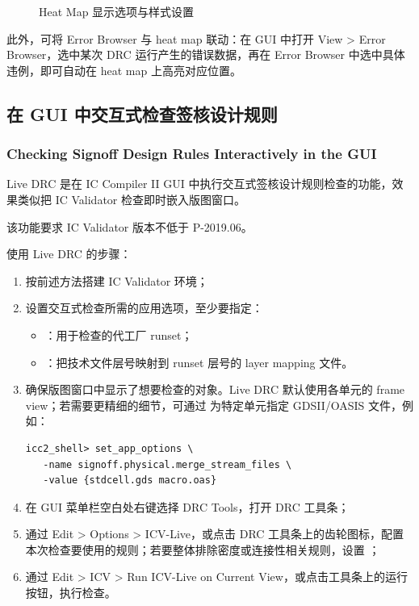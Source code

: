 \begin{figure}[htbp]
\centering
{}
\caption{Heat Map 显示选项与样式设置}
\label{fig:icv-heatmap-config}
\end{figure}

此外，可将 Error Browser 与 heat map 联动：在 GUI 中打开 View > Error Browser，选中某次 DRC 运行产生的错误数据，再在 Error Browser 中选中具体违例，即可自动在 heat map 上高亮对应位置。

\subsection{在 GUI 中交互式检查签核设计规则}
\subsubsection*{Checking Signoff Design Rules Interactively in the GUI}

Live DRC 是在 IC Compiler II GUI 中执行交互式签核设计规则检查的功能，效果类似把 IC Validator 检查即时嵌入版图窗口。

\begin{noteBox}
该功能要求 IC Validator 版本不低于 P-2019.06。
\end{noteBox}

使用 Live DRC 的步骤：
\begin{enumerate}
  \item 按前述方法搭建 IC Validator 环境；
  \item 设置交互式检查所需的应用选项，至少要指定：
        \begin{itemize}
          \item {}：用于检查的代工厂 runset；
          \item {}：把技术文件层号映射到 runset 层号的 layer mapping 文件。
        \end{itemize}
  \item 确保版图窗口中显示了想要检查的对象。Live DRC 默认使用各单元的 frame view；若需要更精细的细节，可通过  为特定单元指定 GDSII/OASIS 文件，例如：
\begin{lstlisting}
icc2_shell> set_app_options \
   -name signoff.physical.merge_stream_files \
   -value {stdcell.gds macro.oas}
\end{lstlisting}
  \item 在 GUI 菜单栏空白处右键选择 DRC Tools，打开 DRC 工具条；
  \item 通过 Edit > Options > ICV-Live，或点击 DRC 工具条上的齿轮图标，配置本次检查要使用的规则；若要整体排除密度或连接性相关规则，设置 ；
  \item 通过 Edit > ICV > Run ICV-Live on Current View，或点击工具条上的运行按钮，执行检查。
\end{enumerate}

